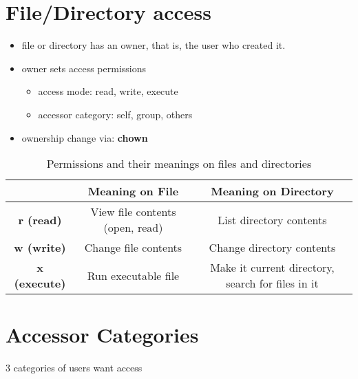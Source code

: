 \documentclass{report}
\begin{document}
  \section{File/Directory access}
  \begin{itemize}
    \item file or directory has an owner, that is, the user who created it.
    \item owner sets access permissions
      \begin{itemize}
        \item access mode: read, write, execute 
        \item accessor category: self, group, others
      \end{itemize}
    \item ownership change via: \textbf{chown}
  \end{itemize}
\begin{table}[ht]
\centering
\begin{tabular}{|c|c|c|}
\hline
 & \textbf{Meaning on File} & \textbf{Meaning on Directory} \\ \hline
\textbf{r (read)} & View file contents (open, read) & List directory contents \\ \hline
\textbf{w (write)} & Change file contents & Change directory contents \\ \hline
\textbf{x (execute)} & Run executable file & Make it current directory, search for files in it \\ \hline
\end{tabular}
\caption{Permissions and their meanings on files and directories}
\end{table}
\newpage
\section{Accessor Categories}
3 categories of users want access
\end{document}
